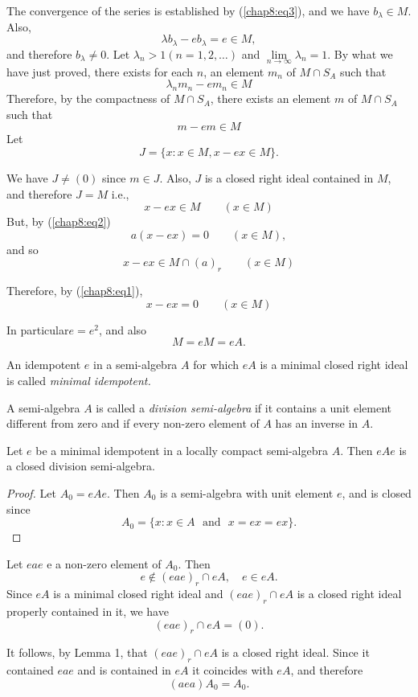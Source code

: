 The convergence of the series is established by (\ref{chap8:eq3}), and we have
$b_{\lambda} \in M$. Also, 
$$
\lambda b_{\lambda}- e b_{\lambda}= e \in M,
$$\pageoriginale
and therefore $b_{\lambda} \neq 0$. Let $\lambda_n > 1 (n =1, 2,
\ldots)$ and $\lim \limits_{n \to \infty} \lambda_n = 1$. By what we
have just proved, there exists for each $n$, an element $m_n $ of $M
\cap S_A$ such that  
$$
\lambda_n m_n - e m_n \in M
$$
Therefore, by the compactness of $M \cap S_A$, there exists an element
$m$ of $M \cap S_A$ such that  
$$
m - e m \in M
$$
Let 
$$
J = \{ x : x \in M, x-e x \in M \}.
$$ 

We have $J \neq (0)$ since $m \in J$. Also, $J$ is a closed right
ideal contained in $M$, and therefore $J = M$ i.e., 
$$
x- ex \in M \qquad (x \in M) 
$$
But, by (\ref{chap8:eq2})
$$
a(x-ex) = 0 \qquad (x \in M),
$$
and so
$$
x- ex \in M \cap (a)_r \qquad (x \in M)
$$

Therefore, by (\ref{chap8:eq1}),
$$
x-ex = 0 \qquad (x \in M)
$$

In particular\pageoriginale $e=e^2$, and also
$$
M = e M = e A.
$$

\begin{Definition}%
  An idempotent $e$ in a semi-algebra $A$ for which $eA$ is a minimal
  closed right ideal is called {\em minimal idempotent.}  
\end{Definition}

A semi-algebra $A$ is called a {\em division semi-algebra} if it
contains a unit element different from zero and if every non-zero
element of $A$ has an inverse in $A$. 

\begin{thmm}\label{chap8:thm8.3}%
  Let $e$ be a minimal idempotent in a locally compact semi-algebra
  $A$. Then $eAe$ is a closed division semi-algebra. 
\end{thmm}

\begin{proof}
  Let $A_0 = eAe$. Then $A_0$ is a semi-algebra with unit element $e$,
  and is closed since 
  $$
  A_0=\{ x : x \in A \text{~ and~ } x = e x = e x \}.
  $$
\end{proof}

Let $eae$ e a non-zero element of $A_0$. Then
$$ 
e \notin (eae)_r \cap eA, \quad e \in e A.
$$
Since $eA$ is a minimal closed right ideal and $(eae)_r \cap eA$ is a
closed right ideal properly contained in it, we have 
$$
(eae)_r \cap eA = (0).
$$

It follows, by Lemma 1, that $(eae)_r \cap eA$ is a closed right ideal. Since
it contained $eae$ and is contained in $eA$ it coincides with $eA$,
and therefore 
$$
(aea) A_0 = A_0.
$$

